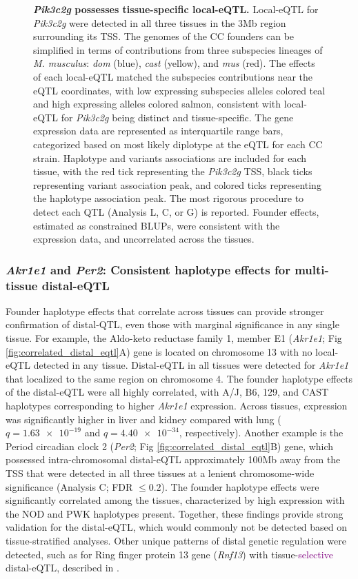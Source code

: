\documentclass[10pt,letterpaper]{article}
\newcommand{\TFinline}[1]{\textcolor{purple}{#1}}
\begin{document}
\begin{figure}[h!]
\caption{\textbf{\textit{Pik3c2g} possesses tissue-specific local-eQTL.} Local-eQTL for \textit{Pik3c2g} were detected in all three tissues in the 3Mb region surrounding its TSS. The genomes of the CC founders can be simplified in terms of contributions from three subspecies lineages of \textit{M. musculus}: \textit{dom} (blue), \textit{cast} (yellow), and \textit{mus} (red). The effects of each local-eQTL matched the subspecies contributions near the eQTL coordinates, with low expressing subspecies alleles colored teal and high expressing alleles colored salmon, consistent with local-eQTL for \textit{Pik3c2g} being distinct and tissue-specific. The gene expression data are represented as interquartile range bars, categorized based on most likely diplotype at the eQTL for each CC strain. Haplotype and variants associations are included for each tissue, with the red tick representing the \textit{Pik3c2g} TSS, black ticks representing variant association peak, and colored ticks representing the haplotype association peak. The most rigorous procedure to detect each QTL (Analysis L, C, or G) is reported. Founder effects, estimated as constrained BLUPs, were consistent with the expression data, and uncorrelated across the tissues.
\label{fig:pik3c2g}}
\end{figure}

\subsubsection*{\textit{Akr1e1} and \textit{Per2}: Consistent haplotype effects for multi-tissue distal-eQTL}
Founder haplotype effects that correlate across tissues can provide stronger confirmation of distal-QTL, even those with marginal significance in any single tissue. 
For example, the Aldo-keto reductase family 1, member E1 (\textit{Akr1e1}; Fig \ref{fig:correlated_distal_eqtl}A) gene is located on chromosome 13 with no local-eQTL detected in any tissue. Distal-eQTL in all tissues were detected for \textit{Akr1e1} that localized to the same region on chromosome 4. The founder haplotype effects of the distal-eQTL were all highly correlated, with A/J, B6, 129, and CAST haplotypes corresponding to higher \textit{Akr1e1} expression. Across tissues, expression was significantly higher in liver and kidney compared with lung ($q = \num{1.63e-19}$ and $q = \num{4.40e-34}$, respectively).
Another example is the Period circadian clock 2 (\textit{Per2}; Fig \ref{fig:correlated_distal_eqtl}B) gene, which possessed intra-chromosomal distal-eQTL approximately 100Mb away from the TSS that were detected in all three tissues at a lenient chromosome-wide significance (Analysis C; FDR $\le 0.2$). The founder haplotype effects were significantly correlated among the tissues, characterized by high expression with the NOD and PWK haplotypes present. Together, these findings provide strong validation for the distal-eQTL, which would commonly not be detected based on tissue-stratified analyses.
Other unique patterns of distal genetic regulation were detected, such as for Ring finger protein 13 gene (\textit{Rnf13}) with tissue-\TFinline{selective} distal-eQTL, described in .
\end{document}
